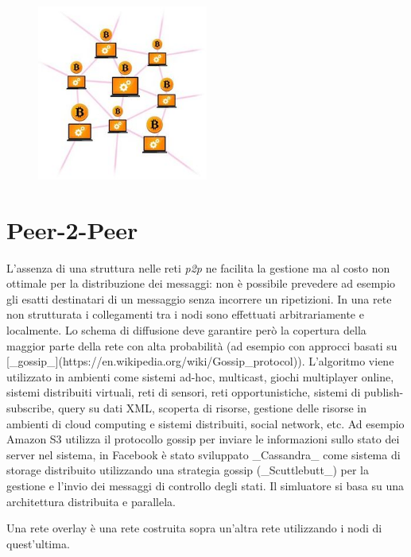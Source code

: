 \begin{figure}
    \centering
    \includegraphics[width=0.5\textwidth]{images/peer2peer_bitcoin.png}
\end{figure}

\section{Peer-2-Peer}
L'assenza di una struttura nelle reti \textit{p2p} ne facilita la gestione ma al costo non ottimale per la distribuzione dei messaggi: non è possibile prevedere ad esempio gli esatti destinatari di un messaggio senza incorrere un ripetizioni.
In una rete non strutturata i collegamenti tra i nodi sono effettuati arbitrariamente e localmente.
Lo schema di diffusione deve garantire però la copertura della maggior parte della rete con alta probabilità (ad esempio con approcci basati su [\_gossip\_](https://en.wikipedia.org/wiki/Gossip\_protocol)). L'algoritmo viene utilizzato in ambienti come sistemi ad-hoc, multicast, giochi multiplayer online, sistemi distribuiti virtuali, reti di sensori, reti opportunistiche, sistemi di publish-subscribe, query su dati XML, scoperta di risorse, gestione delle risorse in ambienti di cloud computing e sistemi distribuiti, social network, etc.
Ad esempio Amazon S3 utilizza il protocollo gossip per inviare le informazioni sullo stato dei server nel sistema, in Facebook è stato sviluppato \_Cassandra\_ come sistema di storage distribuito utilizzando una strategia gossip (\_Scuttlebutt\_) per la gestione e l'invio dei messaggi di controllo degli stati.
Il simluatore si basa su una architettura distribuita e parallela.

Una rete overlay è una rete costruita sopra un'altra rete utilizzando i nodi di quest'ultima.

